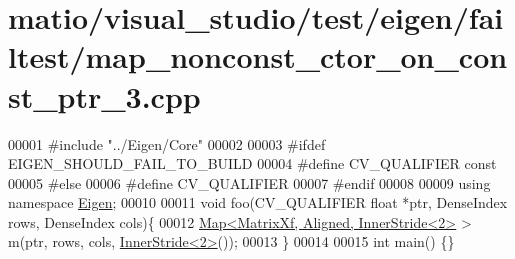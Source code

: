 \hypertarget{matio_2visual__studio_2test_2eigen_2failtest_2map__nonconst__ctor__on__const__ptr__3_8cpp_source}{}\section{matio/visual\+\_\+studio/test/eigen/failtest/map\+\_\+nonconst\+\_\+ctor\+\_\+on\+\_\+const\+\_\+ptr\+\_\+3.cpp}
\label{matio_2visual__studio_2test_2eigen_2failtest_2map__nonconst__ctor__on__const__ptr__3_8cpp_source}

\begin{DoxyCode}
00001 \textcolor{preprocessor}{#include "../Eigen/Core"}
00002 
00003 \textcolor{preprocessor}{#ifdef EIGEN\_SHOULD\_FAIL\_TO\_BUILD}
00004 \textcolor{preprocessor}{#define CV\_QUALIFIER const}
00005 \textcolor{preprocessor}{#else}
00006 \textcolor{preprocessor}{#define CV\_QUALIFIER}
00007 \textcolor{preprocessor}{#endif}
00008 
00009 \textcolor{keyword}{using namespace }\hyperlink{namespace_eigen}{Eigen};
00010 
00011 \textcolor{keywordtype}{void} foo(CV\_QUALIFIER \textcolor{keywordtype}{float} *ptr, DenseIndex rows, DenseIndex cols)\{
00012     \hyperlink{group___core___module_class_eigen_1_1_map}{Map<MatrixXf, Aligned, InnerStride<2>} > m(ptr, rows, cols, 
      \hyperlink{class_eigen_1_1_inner_stride}{InnerStride<2>}());
00013 \}
00014 
00015 \textcolor{keywordtype}{int} main() \{\}
\end{DoxyCode}
